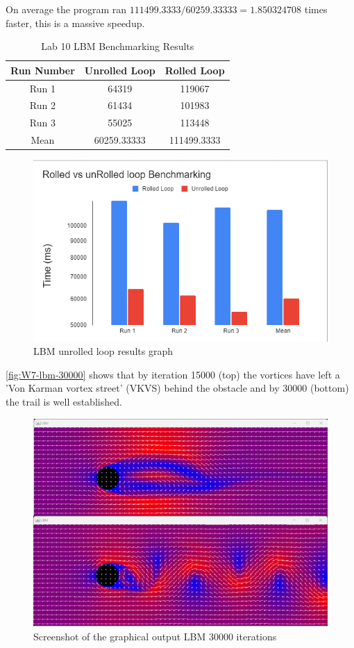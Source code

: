 On average the program ran $111499.3333 / 60259.33333= 1.850324708$ times faster, this is a massive speedup.
\begin{table}[htbp]
      \centering
      \begin{tabular}{|c|c|c|}
            \hline
            \textbf{Run Number} &\textbf{Unrolled Loop} & \textbf{Rolled Loop} \\
            \hline
            Run 1 & 64319 & 119067 \\
            \hline
            Run 2 & 61434 & 101983 \\
            \hline
            Run 3 & 55025 & 113448 \\
            \hline
            Mean & 60259.33333 & 111499.3333 \\
            \hline                      
      \end{tabular}
      \caption{Lab 10 LBM Benchmarking Results}
      \label{fig:W7-bench-results-table}
    \end{table}  
\begin{figure}[H] 
    \centering
    \includegraphics[width=0.9\columnwidth]{Figures/Week 7/graph.png}
    \caption{LBM unrolled loop results graph}
    \label{fig:W7-Graph}
\end{figure}

\autoref{fig:W7-lbm-30000} shows that by iteration 15000 (top) the vortices have left a 'Von Karman vortex street' (VKVS) behind the obstacle and by 30000 (bottom) the trail is well established.

\begin{figure}[H] 
    \centering
    \includegraphics[width=0.49\columnwidth]{Figures/Week 7/LBM-Initial-15000-30000-iterations-output.png}
    \caption{Screenshot of the graphical output LBM 30000 iterations}
    \label{fig:W7-lbm-30000}
\end{figure}


